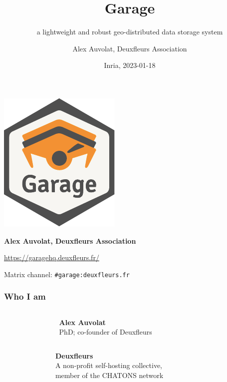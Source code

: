 \documentclass[aspectratio=169]{beamer}
\title{Garage}
\subtitle{a lightweight and robust geo-distributed data storage system}
\author{Alex Auvolat, Deuxfleurs Association}
\date{Inria, 2023-01-18}
\begin{document}
\begin{frame}
	\centering
	\includegraphics[width=.3\linewidth]{../../sticker/Garage.pdf}
	\vspace{1em}

	{\large\bf Alex Auvolat, Deuxfleurs Association}
	\vspace{1em}

	\url{https://garagehq.deuxfleurs.fr/}

	Matrix channel: \texttt{\#garage:deuxfleurs.fr}
\end{frame}

\begin{frame}
	\frametitle{Who I am}
	\begin{columns}[t]
		\begin{column}{.2\textwidth}
			\centering
		\end{column}
		\begin{column}{.6\textwidth}
			\textbf{Alex Auvolat}\\
			PhD; co-founder of Deuxfleurs
		\end{column}
		\begin{column}{.2\textwidth}
			~
		\end{column}
	\end{columns}
	\vspace{2em}

	\begin{columns}[t]
		\begin{column}{.2\textwidth}
			\centering
		\end{column}
		\begin{column}{.6\textwidth}
			\textbf{Deuxfleurs}\\
			A non-profit self-hosting collective,\\
			member of the CHATONS network
		\end{column}
		\begin{column}{.2\textwidth}
			\centering
		\end{column}
	\end{columns}

\end{frame}
\end{document}
